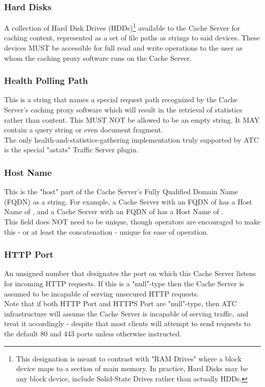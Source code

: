 \subsubsection{Hard Disks}
A collection of Hard Disk Drives (HDDs)\footnote{This designation is meant to
contrast with "RAM Drives" where a block device maps to a section of main
memory. In practice, Hard Disks may be any block device, include Solid-State
Drives rather than actually HDDs.} available to the Cache Server for caching
content, represented as a set of file paths as strings to said devices. These
devices MUST be accessible for full read and write operations to the user as
whom the caching proxy software runs on the Cache Server.

\subsubsection{Health Polling Path}
This is a string that names a special request path recognized by the Cache
Server's caching proxy software which will result in the retrieval of statistics
rather than content. This MUST NOT be allowed to be an empty string. It MAY
contain a query string or even document fragment.\\
The only health-and-statistics-gathering implementation truly supported by ATC
is the special "astats" Traffic Server plugin.

\subsubsection{Host Name}
This is the "host" part of the Cache Server's Fully Qualified Domain Name (FQDN)
as a string. For example, a Cache Server with an FQDN of  has a
Host Name of , and a Cache Server with an FQDN of
 has a Host Name of .\\
This field does NOT need to be unique, though operators are encouraged to make
this - or at least the concatenation  - unique
for ease of operation.

\subsubsection{HTTP Port}
An unsigned number that designates the port on which this Cache Server listens
for incoming HTTP requests. If this is a "null"-type then the Cache Server is
assumed to be incapable of serving unsecured HTTP requests.\\
Note that if both HTTP Port and HTTPS Port are "null"-type, then ATC
infrastructure will assume the Cache Server is incapable of serving traffic, and
treat it accordingly - despite that most clients will attempt to send requests
to the default 80 and 443 ports unless otherwise instructed.


